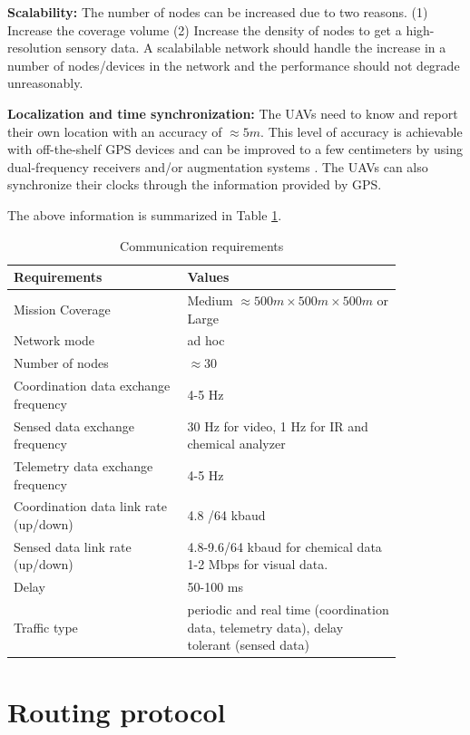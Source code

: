 \textbf{Scalability:} The number of nodes can be increased due to two reasons. (1) Increase the coverage volume (2) Increase the density of nodes to get a high-resolution sensory data. A scalabilable network  should handle the increase in a number of nodes/devices in the network and the performance should not degrade unreasonably. 

\textbf{Localization and time synchronization:} The UAVs need to know and report their own location with an accuracy of $\approx 5 m$. This level of accuracy is achievable with off-the-shelf GPS devices and can be improved to a few centimeters by using dual-frequency receivers and/or augmentation systems \cite{gps_accuracy} . The UAVs can also synchronize their clocks through the information provided by GPS.

The above information is summarized in Table \ref{tab:communication_requirements}.
\begin{table}
\caption{Communication requirements}
\label{tab:communication_requirements}
\begin{tabular}{|p{0.38\linewidth}|p{0.47\linewidth}|}
\toprule
Requirements & Values\\
\midrule
Mission Coverage & Medium $\approx 500 m \times 500 m \times 500 m$ or Large\\
\midrule
Network mode & ad hoc \\
\midrule
Number of nodes &  $\approx 30 $ \\
\midrule
Coordination data exchange frequency &  4-5 Hz \cite{7463007}\\
\midrule
Sensed data exchange frequency & 30 Hz for video, 1 Hz for IR and chemical analyzer \cite{7463007}\\
\midrule
Telemetry data exchange frequency & 4-5 Hz \cite{7463007}\\
\midrule
Coordination data link rate (up/down) & 4.8 /64 kbaud \cite{7463007} \\
\midrule
Sensed data link rate (up/down) & 4.8-9.6/64 kbaud for chemical data \cite{NASA_UAV_mission_parameters} 1-2 Mbps for visual data.\\
\midrule
Delay & 50-100 ms \cite{7463007}\\
\midrule
Traffic type & periodic and real time (coordination data, telemetry data), delay tolerant (sensed data) \\
\bottomrule
\end{tabular}
\end{table}

\section{Routing protocol} 
\label{routing_protocol}

